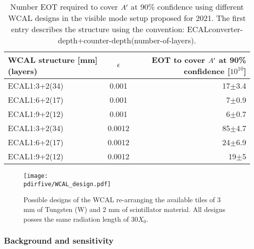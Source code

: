 \begin{center}
\begin{table}[tbh!]
\begin{tabular}{lcr}
  WCAL structure [mm](layers)  & $\epsilon$  & EOT to cover $A'$ at 90\% confidence [$10^{10}$] \\
  \hline
  ECAL1:3+2(34)                & 0.001   & 17$\pm$3.4                                            \\ 
  ECAL1:6+2(17)                & 0.001   & 7$\pm$0.9                                             \\
  ECAL1:9+2(12)                & 0.001   & 6$\pm$0.7                                             \\
  ECAL1:3+2(34)                & 0.0012  & 85$\pm$4.7                                            \\
  ECAL1:6+2(17)                & 0.0012  & 24$\pm$6.9                                            \\  
  ECAL1:9+2(12)                & 0.0012  & 19$\pm$5                                              \\  
  \hline
\end{tabular}
\label{tab:wcal-length-results}
\caption[Possible WCAL design and with their possible experimental reach]{Number EOT required to cover $A'$ at 90\% confidence using different WCAL designs in the visible mode setup proposed for 2021. The first entry describes the structure using the convention:
  ECALconverter-depth+counter-depth(number-of-layers).}
\end{table}
\end{center}

\begin{figure}[tbh!]
  \centering
  \texttt{[image: \\pdirfive/WCAL\_design.pdf]}
  \caption[New WCAL design for 2021]{Possible designs of the WCAL re-arranging the available tiles of 3 mm of Tungsten (W) and 2 mm of scintillator material. All designs posses the same radiation length of 30$X_0$.}
  \label{fig:wcal-design}
\end{figure}


\subsubsection{Background and sensitivity}
\label{ch5:sec:background-sensitivity}

